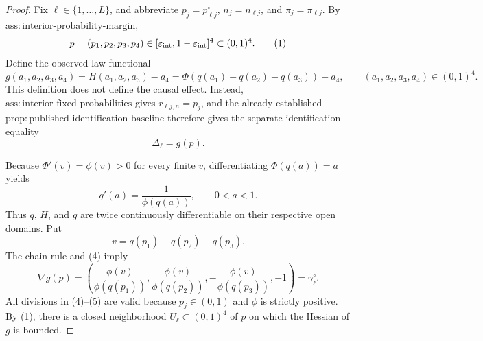 \documentclass{article}
\begin{document}
\begin{proof}
Fix \(\ell\in\{1,\ldots,L\}\), and abbreviate \(p_j=p^{\circ}_{\ell j}\), \(n_j=n_{\ell j}\), and \(\pi_j=\pi_{\ell j}\). By \(\mathrm{ass:interior\mbox{-}probability\mbox{-}margin}\),
\[
 p=(p_1,p_2,p_3,p_4)\in[\varepsilon_{\rm int},1-\varepsilon_{\rm int}]^4\subset(0,1)^4.
\tag{1}
\]
Define the observed-law functional
\[
 g(a_1,a_2,a_3,a_4)=H(a_1,a_2,a_3)-a_4
 =\Phi\!\left(q(a_1)+q(a_2)-q(a_3)\right)-a_4,
 \qquad (a_1,a_2,a_3,a_4)\in(0,1)^4.
\tag{2}
\]
This definition does not define the causal effect. Instead, \(\mathrm{ass:interior\mbox{-}fixed\mbox{-}probabilities}\) gives \(r_{\ell j,n}=p_j\), and the already established \(\mathrm{prop:published\mbox{-}identification\mbox{-}baseline}\) therefore gives the separate identification equality
\[
 \Delta_\ell=g(p).
\tag{3}
\]

Because \(\Phi'(v)=\phi(v)>0\) for every finite \(v\), differentiating \(\Phi(q(a))=a\) yields
\[
 q'(a)=\frac{1}{\phi(q(a))},\qquad 0<a<1.
\tag{4}
\]
Thus \(q\), \(H\), and \(g\) are twice continuously differentiable on their respective open domains. Put
\[
 v=q(p_1)+q(p_2)-q(p_3).
\]
The chain rule and (4) imply
\[
 \nabla g(p)=\left(
 \frac{\phi(v)}{\phi(q(p_1))},
 \frac{\phi(v)}{\phi(q(p_2))},
 -\frac{\phi(v)}{\phi(q(p_3))},
 -1\right)=\gamma^{\circ}_{\ell}.
\tag{5}
\]
All divisions in (4)--(5) are valid because \(p_j\in(0,1)\) and \(\phi\) is strictly positive. By (1), there is a closed neighborhood \(U_\ell\subset(0,1)^4\) of \(p\) on which the Hessian of \(g\) is bounded.


\end{proof}
\end{document}
